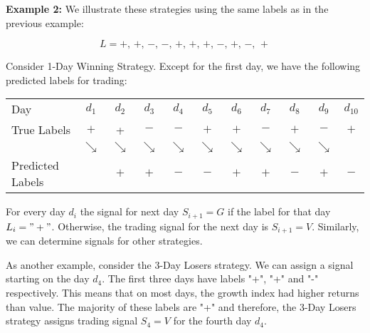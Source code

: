 \documentclass{article}
\begin{document}
\noindent
{\bf Example 2: } We illustrate these strategies using the same labels as in the previous example: 

$$L =  +,\, +,\, -,\, -,\, +,\, +, \, + , \, - , \, +, \, -, \, +$$

Consider 1-Day Winning Strategy. Except for the first day, we have the following predicted labels for trading:
\begin{table}[!ht]
    \centering
    \begin{tabular}{l c c c c c  c c c c c}
        Day & $d_{1}$ & $d_{2}$ & $d_{3}$ & $d_{4}$ & $d_{5}$ & $d_{6}$ & $d_{7}$ & $d_{8}$ & $d_{9}$ & $d_{10}$ \\[5pt]
        True Labels & $+$ & + & $-$ & $-$ & $+$ & $+$ & $-$ & $+$ & $-$ & $+$ \\[5pt]
              & $\searrow$ &  $\searrow$ & $\searrow$ & $\searrow$
                  & $\searrow$ & $\searrow$ & $\searrow$ & $\searrow$ & $\searrow$ 
                  & \\[10pt]
        Predicted Labels &   &  $+$ & $+$ & $-$ & $-$ & $+$ & $+$ & $-$ & $+$ & $-$ \\
\end{tabular}
\end{table}
For every day $d_{i}$ the signal for next day $S_{i+1}=G$ if the label for that day $L_{i}="+"$. Otherwise, the trading signal for the next day is $S_{i+1}=V$. Similarly, we can determine signals for other strategies.

As another example, consider the 3-Day Losers strategy. We can assign a signal starting on the day $d_{4}$. The first three days have labels "+", "+" and "-" respectively. This means that on most days, the growth index had higher returns than value. The majority of these labels are "+" and therefore, the 3-Day Losers strategy assigns trading signal $S_{4}=V$ for the fourth day $d_{4}$.
\end{document}
